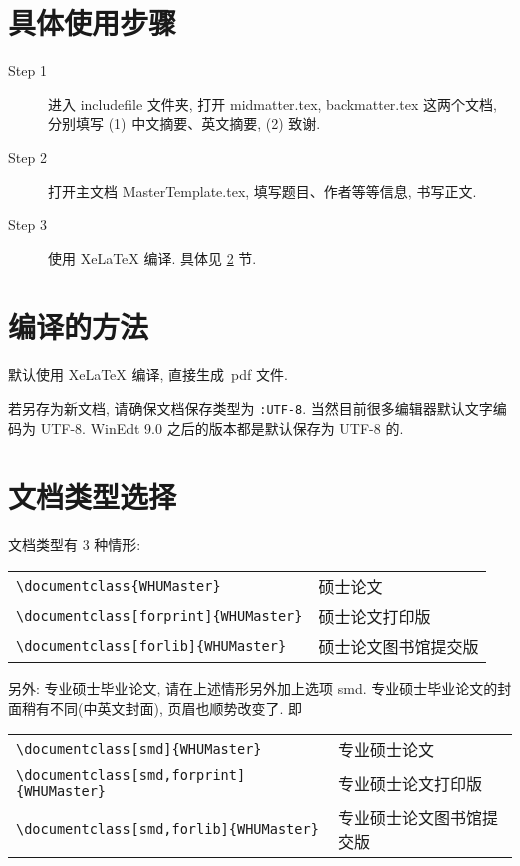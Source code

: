 \documentclass{WHUMaster}   %
\begin{document}
\section{具体使用步骤}
\begin{description}

	\item[Step 1]  进入 includefile 文件夹,  打开 midmatter.tex,  backmatter.tex 这两个文档,
				分别填写 (1) 中文摘要、英文摘要, (2) 致谢.

	\item[Step 2]  打开主文档 MasterTemplate.tex, 填写题目、作者等等信息, 书写正文.

	\item[Step 3]  使用 XeLaTeX 编译. 具体见 \ref{sec-compile} 节.


\end{description}




\section{编译的方法}\label{sec-compile}

默认使用 XeLaTeX 编译, 直接生成~pdf 文件.

若另存为新文档, 请确保文档保存类型为 \verb|:UTF-8|. 当然目前很多编辑器默认文字编码为 UTF-8.
WinEdt 9.0 之后的版本都是默认保存为 UTF-8 的.



\section{文档类型选择}
文档类型有 3 种情形:

\begin{table}[ht]\centering
\begin{tabular}{ll}
\hline
	 \verb|\documentclass{WHUMaster}|                 &  硕士论文 \\
	 \verb|\documentclass[forprint]{WHUMaster}|    &  硕士论文打印版  \\
	 \verb|\documentclass[forlib]{WHUMaster}|       &  硕士论文图书馆提交版  \\
\hline
\end{tabular}
\end{table}

另外: 专业硕士毕业论文, 请在上述情形另外加上选项 smd. 专业硕士毕业论文的封面稍有不同(中英文封面), 页眉也顺势改变了. 即
\begin{table}[ht]\centering
\begin{tabular}{ll}
\hline
	 \verb|\documentclass[smd]{WHUMaster}|               &  专业硕士论文 \\
	 \verb|\documentclass[smd,forprint]{WHUMaster}|    &  专业硕士论文打印版  \\
	 \verb|\documentclass[smd,forlib]{WHUMaster}|       &  专业硕士论文图书馆提交版  \\
\hline
\end{tabular}
\end{table}
\end{document}
